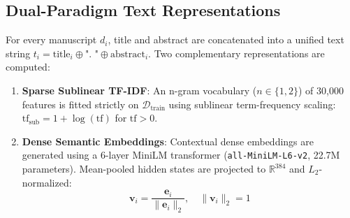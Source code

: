 \documentclass[journal]{IEEEtran}
\begin{document}
\subsection{Dual-Paradigm Text Representations}
For every manuscript $d_i$, title and abstract are concatenated into a unified text string $t_i = \text{title}_i \oplus \text{". "} \oplus \text{abstract}_i$. Two complementary representations are computed:
\begin{enumerate}
    \item \textbf{Sparse Sublinear TF-IDF}: An n-gram vocabulary ($n \in \{1, 2\}$) of 30,000 features is fitted strictly on $\mathcal{D}_{\text{train}}$ using sublinear term-frequency scaling: $\text{tf}_{\text{sub}} = 1 + \log(\text{tf})$ for $\text{tf} > 0$.
    \item \textbf{Dense Semantic Embeddings}: Contextual dense embeddings are generated using a 6-layer MiniLM transformer (\texttt{all-MiniLM-L6-v2}, 22.7M parameters). Mean-pooled hidden states are projected to $\mathbb{R}^{384}$ and $L_2$-normalized:
    \begin{equation}
        \mathbf{v}_i = \frac{\mathbf{e}_i}{\|\mathbf{e}_i\|_2}, \quad \|\mathbf{v}_i\|_2 = 1
    \end{equation}
\end{enumerate}
\end{document}
